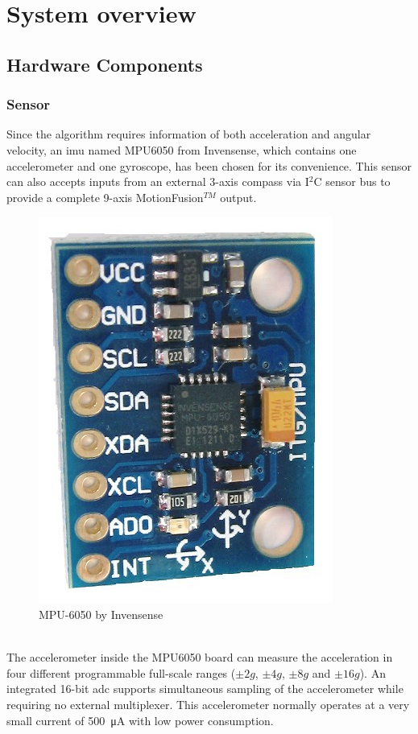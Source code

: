 \documentclass[letterpaper,12pt,titlepage,oneside,final]{book}
\begin{document}
\chapter{System overview}

\section{Hardware Components}

\subsection{Sensor}
Since the algorithm requires information of both acceleration and angular velocity, an \gls{imu} named MPU6050 from Invensense\textregistered, which contains one accelerometer and one gyroscope, has been chosen for its convenience. This sensor can also accepts inputs from an external 3-axis compass via I$^{2}$C sensor bus to provide a complete 9-axis MotionFusion$^{TM}$ output.
 \begin{figure}[h]
	\centering
	\includegraphics[scale=0.25]{mpu6050}
	\caption{MPU-6050 by Invensense \cite{mpu}}
\end{figure}\\
The accelerometer inside the MPU6050 board can measure the acceleration in four different programmable full-scale ranges ($\pm2g$, $\pm4g$, $\pm8g$ and $\pm16g$). An integrated 16-bit \gls{adc} supports simultaneous sampling of the accelerometer while requiring no external multiplexer. This accelerometer normally operates at a very small current of \SI{500}{\micro\ampere} with low power consumption. 
\end{document}
